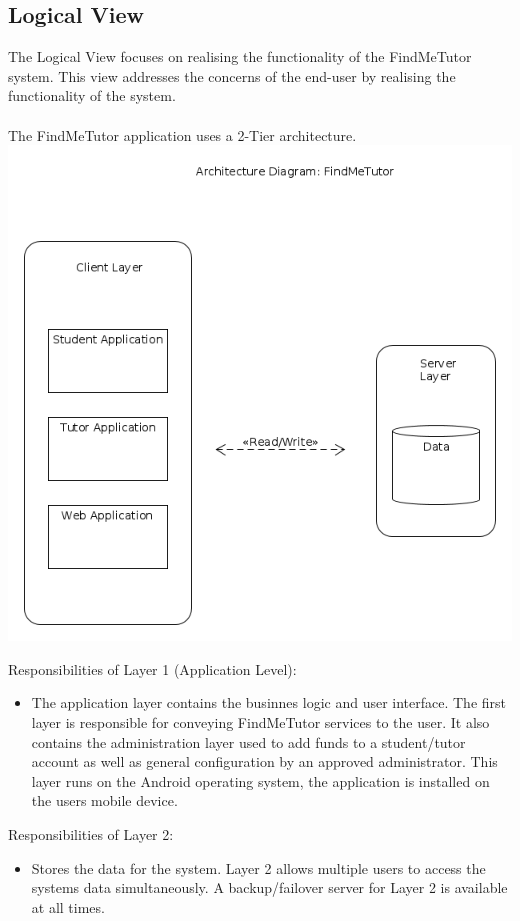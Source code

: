 \documentclass[12pt]{article}
\begin{document}
\pagebreak
\subsection{Logical View}
The Logical View focuses on realising the functionality of the FindMeTutor system. This view addresses the concerns of the end-user by realising the functionality of the system.\\\\
The FindMeTutor application uses a 2-Tier architecture.\\
\includegraphics[width=140mm]{./architecture_diagram.png}

Responsibilities of Layer 1 (Application Level):
\begin{itemize}
\item The application layer contains the businnes logic and user interface. The first layer is responsible for conveying FindMeTutor services to the user. It also contains the administration layer used to add funds to a student/tutor account as well as general configuration by an approved administrator. This layer runs on the Android operating system, the application is installed on the users mobile device.
\end{itemize}

Responsibilities of Layer 2:
\begin{itemize}
\item Stores the data for the system. Layer 2 allows multiple users to access the systems data simultaneously. A backup/failover server for Layer 2 is available at all times.
\end{itemize}
\end{document}
